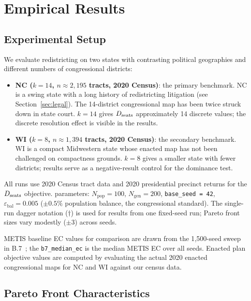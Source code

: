 \section{Empirical Results}
\label{sec:results}

\subsection{Experimental Setup}

We evaluate \nsga{} redistricting on two states with contrasting
political geographies and different numbers of congressional districts:

\begin{itemize}
\item \textbf{NC ($k=14$, $n \approx 2{,}195$ tracts, 2020 Census)}: the
  primary benchmark.
  NC is a swing state with a long history of redistricting litigation
  (see Section~\ref{sec:legal}).
  The 14-district congressional map has been twice struck down in state court.
  $k=14$ gives $D_{\mathrm{seats}}$ approximately 14 discrete values; the discrete
  resolution effect is visible in the results.

\item \textbf{WI ($k=8$, $n \approx 1{,}394$ tracts, 2020 Census)}: the
  secondary benchmark.
  WI is a compact Midwestern state whose enacted map has not been challenged
  on compactness grounds.
  $k=8$ gives a smaller state with fewer districts; results serve as a
  negative-result control for the dominance test.
\end{itemize}

All runs use 2020 Census tract data and 2020 presidential precinct returns for
the $D_{\mathrm{seats}}$ objective.
\nsga{} parameters: $N_{\mathrm{pop}} = 100$, $N_{\mathrm{gen}} = 200$,
\texttt{base\_seed = 42}, $\varepsilon_{\mathrm{bal}} = 0.005$ ($\pm 0.5\%$
population balance, the congressional standard).
The single-run dagger notation ($\dagger$) is used for results from one
fixed-seed run; Pareto front sizes vary modestly ($\pm 3$) across seeds.

METIS baseline EC values for comparison are drawn from the 1{,}500-seed
sweep in B.7~\citep{b7paper}; the \texttt{b7\_median\_ec} is the median METIS
EC over all seeds.
Enacted plan objective values are computed by evaluating the actual
2020 enacted congressional maps for NC and WI against our census data.

\subsection{Pareto Front Characteristics}

